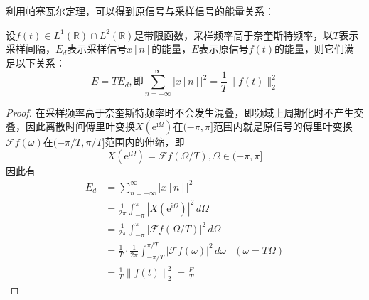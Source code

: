 利用帕塞瓦尔定理，可以得到原信号与采样信号的能量关系：

\begin{theorem}
    设$f(t)\in L^1(\mathbb{R})\cap L^2(\mathbb{R})$是带限函数，采样频率高于奈奎斯特频率，以$T$表示采样间隔，$E_d$表示采样信号$x[n]$的能量，$E$表示原信号$f(t)$的能量，则它们满足以下关系：
    \[E=TE_d,\text{即}\sum_{n=-\infty}^{\infty}|x[n]|^2=\frac{1}{T}\|f(t)\|_2^2\]
\end{theorem}
\begin{proof}
    在采样频率高于奈奎斯特频率时不会发生混叠，即频域上周期化时不产生交叠，因此离散时间傅里叶变换$X(\mathrm{e}^{\mathrm{i}\Omega})$在$(-\pi,\pi]$范围内就是原信号的傅里叶变换$\mathcal{F} f(\omega)$在$(-\pi/T,\pi/T]$范围内的伸缩，即
    \[X(\mathrm{e}^{\mathrm{i}\Omega})=\mathcal{F} f(\Omega/T),\Omega\in(-\pi,\pi]\]
    因此有
    \begin{align*}
        E_d&=\sum_{n=-\infty}^{\infty}|x[n]|^2\\
        &=\frac{1}{2\pi}\int_{-\pi}^{\pi}|X(\mathrm{e}^{\mathrm{i}\Omega})|^2\,d\Omega\\
        &=\frac{1}{2\pi}\int_{-\pi}^{\pi}|\mathcal{F} f(\Omega/T)|^2\,d\Omega\\
        &=\frac{1}{T}\cdot\frac{1}{2\pi}\int_{-\pi/T}^{\pi/T}|\mathcal{F} f(\omega)|^2\,d\omega&(\omega=T\Omega)\\
        &=\frac{1}{T}\|f(t)\|_2^2=\frac{E}{T}
    \end{align*}
\end{proof}